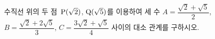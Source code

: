 수직선 위의 두 점~$\mathrm{P}(\sqrt{2})$, $\mathrm{Q}(\sqrt{5})$를 이용하여 세 수 $A=\dfrac{\sqrt{2}+\sqrt{5}}{2}$, $B=\dfrac{\sqrt{2}+2\sqrt{5}}{3}$, $C=\dfrac{3\sqrt{2}+\sqrt{5}}{4}$ 사이의 대소 관계를 구하시오.
